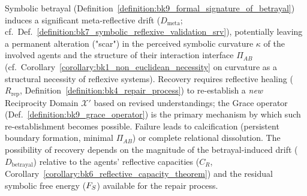 \begin{proposition}
\label{proposition:bk9_curvature_scarring}
Symbolic betrayal (Definition~\ref{definition:bk9_formal_signature_of_betrayal}) induces a significant meta-reflective drift ($D_{\text{meta}}$; cf.~Def.~\ref{definition:bk7_symbolic_reflexive_validation_srv}), potentially leaving a permanent alteration ("scar") in the perceived symbolic curvature $\kappa$ of the involved agents and the structure of their interaction interface $\Pi_{AB}$ (cf.~Corollary~\ref{corollary:bk1_non_euclidean_necessity} on curvature as a structural necessity of reflexive systems). Recovery requires reflective healing ($R_{\text{rep}}$, Definition~\ref{definition:bk4_repair_process}) to re-establish a \emph{new} Reciprocity Domain $\mathcal{X}'$ based on revised understandings; the Grace operator (Def.~\ref{definition:bk9_grace_operator}) is the primary mechanism by which such re-establishment becomes possible. Failure leads to calcification (persistent boundary formation, minimal $\Pi_{AB}$) or complete relational dissolution. The possibility of recovery depends on the magnitude of the betrayal-induced drift ($D_{\text{betrayal}}$) relative to the agents' reflective capacities ($C_R$, Corollary~\ref{corollary:bk6_reflective_capacity_theorem}) and the residual symbolic free energy ($F_S$) available for the repair process.
\end{proposition}
